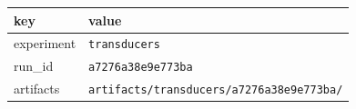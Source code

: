 \begin{tabular}{ll}%
\hline%
\textbf{key}&\textbf{value}\\%
\hline%
experiment&\texttt{transducers}\\%
run\_id&\texttt{a7276a38e9e773ba}\\%
artifacts&\texttt{artifacts/transducers/a7276a38e9e773ba/}\\%
\hline%
\end{tabular}
